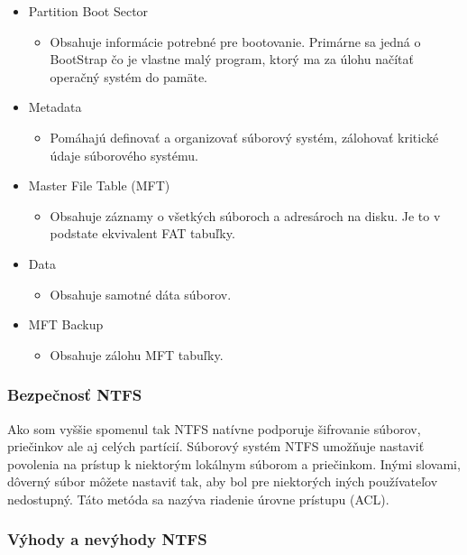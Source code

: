 \documentclass[12pt,oneside,slovak,a4paper]{article}
\begin{document}
\begin{spacing}{1.0}
\begin{itemize}
	\item Partition Boot Sector
		\begin{itemize}
			\item Obsahuje informácie potrebné pre bootovanie. Primárne sa jedná o BootStrap čo je vlastne malý program, ktorý ma za úlohu načítať operačný systém do pamäte.
		\end{itemize}
	\item Metadata
		\begin{itemize}
			\item Pomáhajú definovať a organizovať súborový systém, zálohovať kritické údaje súborového systému.
		\end{itemize}
	\item Master File Table (MFT)
		\begin{itemize}
			\item Obsahuje záznamy o všetkých súboroch a adresároch na disku. Je to v podstate ekvivalent FAT tabuľky.
		\end{itemize}
	\item Data
		\begin{itemize}
			\item Obsahuje samotné dáta súborov.
		\end{itemize}
	\item MFT Backup
		\begin{itemize}
			\item Obsahuje zálohu MFT tabuľky.
		\end{itemize}
\end{itemize}
\end{spacing}

\subsubsection{Bezpečnosť NTFS}
Ako som vyššie spomenul tak NTFS natívne podporuje šifrovanie súborov, priečinkov ale aj celých partícií. Súborový systém NTFS umožňuje nastaviť povolenia na prístup k niektorým lokálnym súborom a priečinkom. Inými slovami, dôverný súbor môžete nastaviť tak, aby bol pre niektorých iných používateľov nedostupný. Táto metóda sa nazýva riadenie úrovne prístupu (ACL).

\subsubsection{Výhody a nevýhody NTFS}
\end{document}
